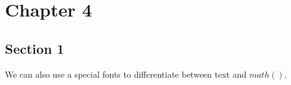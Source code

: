 \chapter{Chapter 4}\label{ch:ch4}

\section{Section 1}

We can also use a special fonts to differentiate between text and $math()$.

